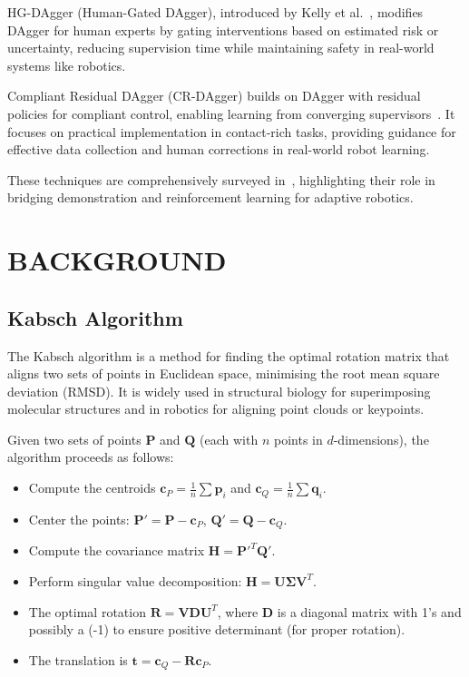 \documentclass[a4paper, 10pt, conference]{ieeeconf}
\begin{document}
HG-DAgger (Human-Gated DAgger), introduced by Kelly et al.~\cite{kelly2019hg}, modifies DAgger for human experts by gating interventions based on estimated risk or uncertainty, reducing supervision time while maintaining safety in real-world systems like robotics.

Compliant Residual DAgger (CR-DAgger) builds on DAgger with residual policies for compliant control, enabling learning from converging supervisors~\cite{balakrishna2019imitation}.
It focuses on practical implementation in contact-rich tasks, providing guidance for effective data collection and human corrections in real-world robot learning.

These techniques are comprehensively surveyed in~\cite{celemin2022interactive}, highlighting their role in bridging demonstration and reinforcement learning for adaptive robotics.

\section{BACKGROUND}

\subsection{Kabsch Algorithm}

The Kabsch algorithm is a method for finding the optimal rotation matrix that aligns two sets of points in Euclidean space, minimising the root mean square deviation (RMSD).
It is widely used in structural biology for superimposing molecular structures and in robotics for aligning point clouds or keypoints.

Given two sets of points \(\mathbf{P}\) and \(\mathbf{Q}\) (each with \(n\) points in \(d\)-dimensions), the algorithm proceeds as follows:
\begin{itemize}
    \item Compute the centroids \(\mathbf{c}_P = \frac{1}{n} \sum \mathbf{p}_i\) and \(\mathbf{c}_Q = \frac{1}{n} \sum \mathbf{q}_i\).
    \item Center the points: \(\mathbf{P}' = \mathbf{P} - \mathbf{c}_P\), \(\mathbf{Q}' = \mathbf{Q} - \mathbf{c}_Q\).
    \item Compute the covariance matrix \(\mathbf{H} = \mathbf{P}'^T \mathbf{Q}'\).
    \item Perform singular value decomposition: \(\mathbf{H} = \mathbf{U} \boldsymbol{\Sigma} \mathbf{V}^T\).
    \item The optimal rotation \(\mathbf{R} = \mathbf{V} \mathbf{D} \mathbf{U}^T\), where \(\mathbf{D}\) is a diagonal matrix with 1's and possibly a (-1) to ensure positive determinant (for proper rotation).
    \item The translation is \(\mathbf{t} = \mathbf{c}_Q - \mathbf{R} \mathbf{c}_P\).
\end{itemize}
\end{document}
